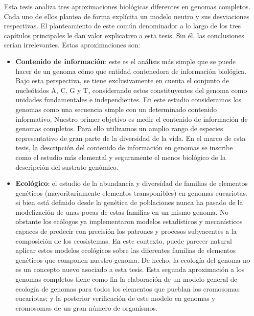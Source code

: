 Esta tesis analiza tres aproximaciones biológicas diferentes en genomas completos. Cada uno de ellos plantea de forma explícita un modelo neutro y sus desviaciones respectivas. El planteamiento de este común denominador a lo largo de los tres capítulos principales le dan valor explicativo a esta tesis. Sin él, las conclusiones serian irrelevantes. Estas aproximaciones son:
\begin{itemize}
\item \textbf{Contenido de información}: este es  el análisis más simple que se puede hacer de un genoma cómo que entidad contenedora de información biológica. Bajo esta perspectiva, se tiene exclusivamente en cuenta el conjunto de nucleótidos A, C, G y T, considerando estos constituyentes del genoma como unidades fundamentales e independientes. En este estudio consideramos los genomas como una secuencia simple con un determinado contenido informativo. Nuestro primer objetivo es medir el contenido de información de genomas completos. Para ello utilizamos un amplio rango de especies representativo de gran parte de la diversidad de la vida. En el marco de esta tesis, la descripción del contenido de información en genomas se inscribe como el estudio más elemental y seguramente el menos biológico de la descripción del sustrato genómico.
\item \textbf{Ecológico}: el estudio de la abundancia y diversidad de familias de elementos genéticos (mayoritariamente elementos transponibles) en genomas eucariotas, si bien está definido desde la genética de poblaciones nunca ha pasado de la modelización de unas pocas de estas familias en un mismo genoma. No obstante los ecólogos ya implementaron modelos estadísticos y mecanísticos capaces de predecir con precisión los patrones y procesos subyacentes a la composición de los ecosistemas. En este contexto, puede parecer natural aplicar estos modelos ecológicos sobre las diferentes familias de elementos genéticos que componen nuestro genoma. De hecho, la ecología del genoma no es un concepto nuevo asociado a esta tesis. Esta segunda aproximación a los genomas completos tiene como fin la elaboración de un modelo general de ecología de genomas para todos los elementos que pueblan los cromosomas eucariotas; y la posterior verificación de este modelo en genomas y cromosomas de un gran número de organismos.

\end{itemize}
